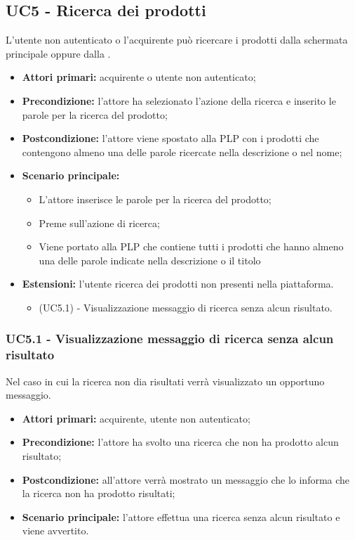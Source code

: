 \subsection{UC5 - Ricerca dei prodotti} \label{UC5} 
L'utente non autenticato o l'acquirente può ricercare i prodotti dalla schermata principale oppure dalla .
\begin{itemize}
    \item \textbf{Attori primari:} acquirente o utente non autenticato;
    \item \textbf{Precondizione:} l'attore ha selezionato l'azione della ricerca e inserito le parole per la ricerca del prodotto;
    \item \textbf{Postcondizione:} l'attore viene spostato alla PLP con i prodotti che contengono almeno una delle parole ricercate nella descrizione o nel nome;
    \item \textbf{Scenario principale:} 
    \begin{itemize}
        \item L'attore inserisce le parole per la ricerca del prodotto;
        \item Preme sull'azione di ricerca;
        \item Viene portato alla PLP che contiene tutti i prodotti che hanno almeno una delle parole indicate nella descrizione o il titolo
    \end{itemize}
    \item \textbf{Estensioni:} l'utente ricerca dei prodotti non presenti nella piattaforma.
    \begin{itemize}
    	\item (UC5.1) - Visualizzazione messaggio di ricerca senza alcun risultato.
    \end{itemize}
\end{itemize}

\subsubsection{UC5.1 - Visualizzazione messaggio di ricerca senza alcun risultato} \label{UC5.1}
Nel caso in cui la ricerca non dia risultati verrà visualizzato un opportuno messaggio.
\begin{itemize}
	\item \textbf{Attori primari:} acquirente, utente non autenticato;
	\item \textbf{Precondizione:} l'attore ha svolto una ricerca che non ha prodotto alcun risultato;
	\item \textbf{Postcondizione:} all'attore verrà mostrato un messaggio che lo informa che la ricerca non ha prodotto risultati;
	\item \textbf{Scenario principale:} l'attore effettua una ricerca senza alcun risultato e viene avvertito.
\end{itemize}


